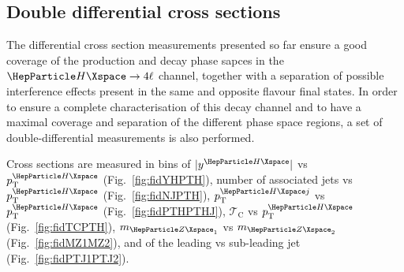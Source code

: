 \clearpage

\subsection{Double differential cross sections}
The differential cross section measurements presented so far ensure a good coverage of the production and decay phase sapces in the $\Hllll$ channel, together with a separation of possible interference effects present in the same and opposite flavour final states.
In order to ensure a complete characterisation of this decay channel and to have a maximal coverage and separation of the different phase space regions, a set of double-differential measurements is also performed.

Cross sections are measured in bins of $\abs{y^{\PH}}$ vs $\pt^{\PH}$ (Fig.~\ref{fig:fidYHPTH}), number of associated jets vs  $\pt^{\PH}$ (Fig.~\ref{fig:fidNJPTH}), $\pt^{\PH j}$ vs $\pt^{\PH}$ (Fig.~\ref{fig:fidPTHPTHJ}), $\mathcal{T}_{\text{C}}$ vs $\pt^{\PH}$ (Fig.~\ref{fig:fidTCPTH}), $m_{\PZ_{1}}$ vs $m_{\PZ_{2}}$ (Fig.~\ref{fig:fidMZ1MZ2}), and \pt of the leading  vs sub-leading jet (Fig.~\ref{fig:fidPTJ1PTJ2}).

\clearpage


